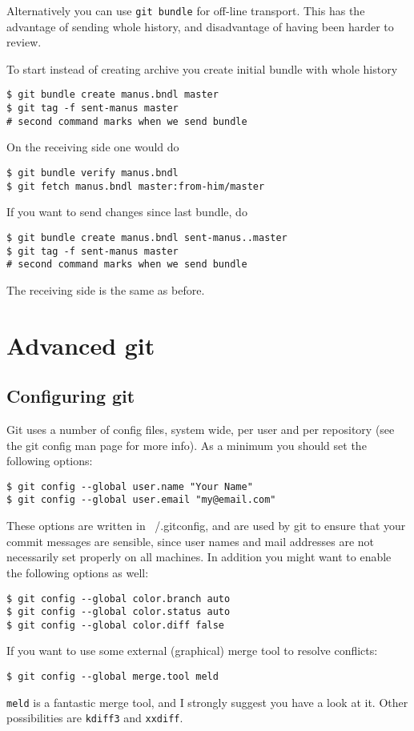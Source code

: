 \documentclass[a4paper,10pt]{article}
\begin{document}
Alternatively you can use \texttt{git bundle} for off-line
transport. This has the advantage of sending whole history, and
disadvantage of having been harder to review.

To start instead of creating archive you create initial bundle with
whole history
\begin{verbatim}
$ git bundle create manus.bndl master
$ git tag -f sent-manus master
# second command marks when we send bundle
\end{verbatim}
On the receiving side one would do
\begin{verbatim}
$ git bundle verify manus.bndl
$ git fetch manus.bndl master:from-him/master
\end{verbatim}

If you want to send changes since last bundle, do
\begin{verbatim}
$ git bundle create manus.bndl sent-manus..master
$ git tag -f sent-manus master
# second command marks when we send bundle
\end{verbatim}
The receiving side is the same as before.

\section{Advanced git}
\subsection{Configuring git}
Git uses a number of config files, system
wide, per user and per repository (see the git config man page for more info).
As a minimum you should set the following options:
\begin{verbatim}
$ git config --global user.name "Your Name"
$ git config --global user.email "my@email.com"
\end{verbatim}
These options are written in ~/.gitconfig, and are used by git to ensure that
your commit messages are sensible, since user names and mail addresses are not
necessarily set properly on all machines. In addition you might want to enable
the following options as well:
\begin{verbatim}
$ git config --global color.branch auto
$ git config --global color.status auto
$ git config --global color.diff false
\end{verbatim}
If you want to use some external (graphical) merge tool to resolve conflicts:
\begin{verbatim}
$ git config --global merge.tool meld
\end{verbatim}
\texttt{meld} is a fantastic merge tool, and I strongly suggest you have a
look at it.  Other possibilities are \texttt{kdiff3} and \texttt{xxdiff}.
\end{document}

